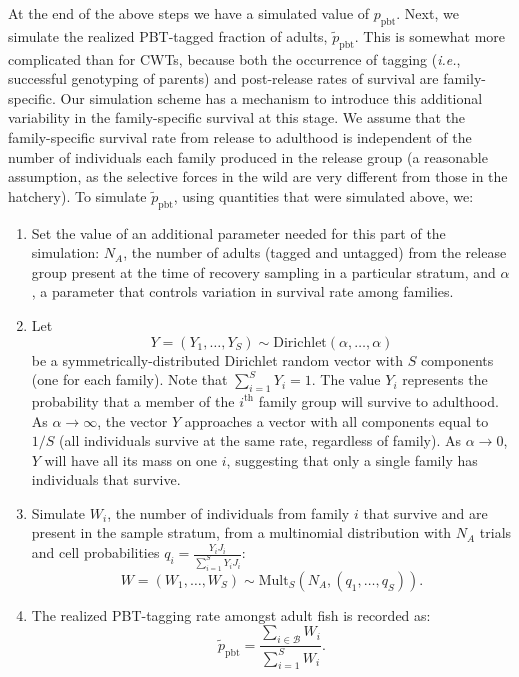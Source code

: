 \documentclass[11pt]{article}
\newcommand{\thh}{^\mathrm{th}}
\newcommand{\ie}{{\em i.e.},\xspace }
\begin{document}
At the end of the above steps we have a simulated value of $p_\mathrm{pbt}$.  Next, we simulate
the realized PBT-tagged fraction of adults, $\tilde{p}_\mathrm{pbt}$. 
This is somewhat more complicated than for CWTs, because both the occurrence of tagging (\ie successful genotyping of parents)
and post-release rates of survival
are family-specific.  Our simulation scheme has a mechanism to introduce this additional
variability in  the family-specific survival at this stage.  We assume that the family-specific survival rate from release 
to adulthood is independent of the number of individuals each family produced in the release
group (a reasonable assumption, as the selective forces in the wild are very different from those in the 
hatchery).    To simulate $\tilde{p}_\mathrm{pbt}$, using
quantities that were simulated above, we:
\begin{enumerate}
\item Set the value of an additional parameter needed for this part of the simulation: $N_A$, the number
of adults (tagged and untagged) from the release group present at the time of recovery sampling in a particular stratum, and $\alpha$,
a parameter that controls variation in survival rate among families. 
\item Let 
\[
Y = (Y_1,\ldots, Y_S) \sim \mathrm{Dirichlet}(\alpha, \ldots, \alpha)
\]
be a symmetrically-distributed Dirichlet random vector with $S$ components (one for each family).  Note that
$\sum_{i=1}^S Y_i =1$.  The value $Y_i$ represents the probability that a member of the $i\thh$ family group
will survive to adulthood.  As $\alpha \rightarrow \infty$, the vector $Y$ approaches a vector with
all components equal to $1/S$ (all individuals survive at the same rate, regardless of family).  As $\alpha
\rightarrow 0$, $Y$ will have all its mass on one $i$, suggesting that only a single family has individuals
that survive.
\item Simulate $W_i$, the number of individuals from family $i$
that survive and are present in the sample stratum, from a multinomial distribution
with $N_A$ trials and cell probabilities $q_i = \frac{Y_i J_i}{\sum_{i=1}^S Y_i J_i}$:
\[
W = (W_1,\ldots, W_S) \sim \mathrm{Mult}_S(N_A, (q_1, \ldots, q_S)).
\]
\item The realized PBT-tagging rate amongst adult fish is recorded as:
\[
\tilde{p}_\mathrm{pbt} = \frac{\sum_{i\in\mathcal{B}} W_i}{\sum_{i=1}^S W_i}.
\]
\end{enumerate}
\end{document}
